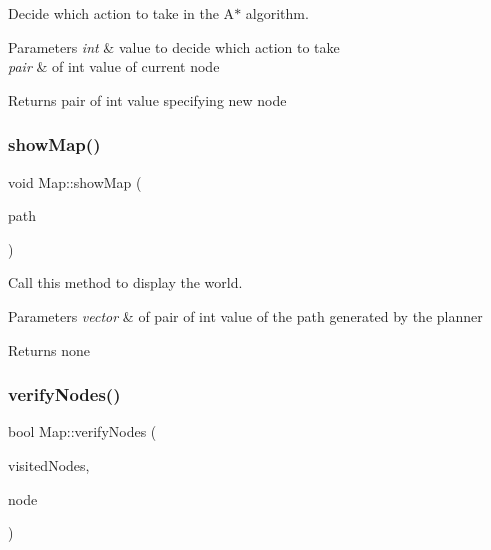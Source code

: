 Decide which action to take in the A$\ast$ algorithm. 


\begin{DoxyParams}{Parameters}
{\em int} & value to decide which action to take \\
\hline
{\em pair} & of int value of current node \\
\hline
\end{DoxyParams}
\begin{DoxyReturn}{Returns}
pair of int value specifying new node 
\end{DoxyReturn}
\mbox{\label{classMap_a9bc56eece073ec04088a94b08a57cfd6}} 
\subsubsection{\texorpdfstring{show\+Map()}{showMap()}}
{\footnotesize\ttfamily void Map\+::show\+Map (\begin{DoxyParamCaption}\item[{std\+::vector$<$ std\+::pair$<$ int, int $>$ $>$}]{path }\end{DoxyParamCaption})}



Call this method to display the world. 


\begin{DoxyParams}{Parameters}
{\em vector} & of pair of int value of the path generated by the planner \\
\hline
\end{DoxyParams}
\begin{DoxyReturn}{Returns}
none 
\end{DoxyReturn}
\mbox{\label{classMap_a1add0d83fabc9c895eddc4cae32c0ad1}} 
\subsubsection{\texorpdfstring{verify\+Nodes()}{verifyNodes()}}
{\footnotesize\ttfamily bool Map\+::verify\+Nodes (\begin{DoxyParamCaption}\item[{std\+::map$<$ std\+::pair$<$ int, int $>$, int $>$}]{visited\+Nodes,  }\item[{std\+::pair$<$ int, int $>$}]{node }\end{DoxyParamCaption})}



